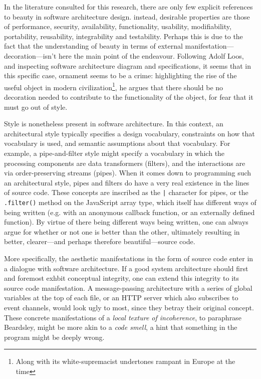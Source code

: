 \documentclass{article}
\begin{document}
In the literature consulted for this research, there are only few explicit references to beauty in software architecture design. instead, desirable properties are those of performance, security, availability, functionality, usability, modifiability, portability, reusability, integrability and testability. Perhaps this is due to the fact that the understanding of beauty in terms of external manifestation—decoration—isn't here the main point of the endeavour. Following Adolf Loos, and inspecting software architecture diagram and specifications, it seems that in this specific case, ornament seems to be a crime: highlighting the rise of the useful object in modern civilization\footnote{Along with its white-supremacist undertones rampant in Europe at the time}, he argues that there should be no decoration needed to contribute to the functionality of the object, for fear that it must go out of style.

Style is nonetheless present in software architecture. In this context, an architectural style typically specifies a design vocabulary, constraints on how that vocabulary is used, and semantic assumptions about that vocabulary. For example, a pipe-and-filter style might specify a vocabulary in which the processing components are data transformers (filters), and the interactions are via order-preserving streams (pipes). When it comes down to programming such an architectural style, pipes and filters do have a very real existence in the lines of source code. These concepts are inscribed as the \lstinline{|} character for pipes, or the \lstinline{.filter()} method on the JavaScript array type, which itself has different ways of being written (e.g. with an anonymous callback function, or an externally defined function). By virtue of there being different ways being written, one can always argue for whether or not one is better than the other, ultimately resulting in better, clearer—and perhaps therefore beautiful—source code.

More specifically, the aesthetic manifestations in the form of source code enter in a dialogue with software architecture. If a good system architecture should first and foremost exhbit conceptual integrity\cite{spinellis_beautiful_2009}, one can extend this integrity to its source code manifestation. A message-passing architecture with a series of global variables at the top of each file, or an HTTP server which also subscribes to event channels, would look ugly to most, since they betray their original concept. These concrete manifestations of a \emph{local texture of incoherence}, to paraphrase Beardsley, might be more akin to a \emph{code smell}, a hint that something in the program might be deeply wrong.
\end{document}
